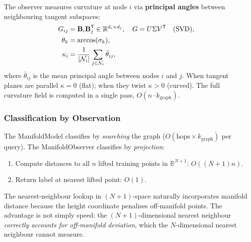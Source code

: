 \documentclass[12pt,letterpaper]{article}
\newcommand{\RR}{\mathbb{R}}
\newcommand{\bB}{\mathbf{B}}
\newcommand{\T}{\mathsf{T}}
\begin{document}
The observer measures curvature at node $i$ via \textbf{principal angles}
between neighbouring tangent subspaces:
\begin{align}
  G_{ij}      &= \bB_i \bB_j^\T \in \RR^{d_i \times d_j}, \quad G = U\Sigma V^\T
               \quad\text{(SVD)},\notag\\
  \theta_k    &= \arccos(\sigma_k), \label{eq:curvature}\\
  \kappa_i    &= \frac{1}{|\mathcal{N}_i|}\sum_{j\in\mathcal{N}_i} \bar\theta_{ij},
  \notag
\end{align}
where $\bar\theta_{ij}$ is the mean principal angle between nodes $i$ and $j$.
When tangent planes are parallel $\kappa=0$ (flat); when they twist $\kappa>0$
(curved).  The full curvature field is computed in a single pass, $O(n \cdot
k_\text{graph})$.

\subsubsection{Classification by Observation}

The ManifoldModel classifies by \emph{searching} the graph
($O(\text{hops}\times k_\text{graph})$ per query).  The ManifoldObserver
classifies by \emph{projection}:
\begin{enumerate}[leftmargin=*]
  \item Compute distances to all $n$ lifted training points in $\RR^{N+1}$:
    $O((N{+}1) n)$.
  \item Return label at nearest lifted point: $O(1)$.
\end{enumerate}
The nearest-neighbour lookup in $(N{+}1)$-space naturally incorporates manifold
distance because the height coordinate penalises off-manifold points.  The
advantage is not simply speed: the $(N{+}1)$-dimensional nearest neighbour
\emph{correctly accounts for off-manifold deviation}, which the $N$-dimensional
nearest neighbour cannot measure.
\end{document}
